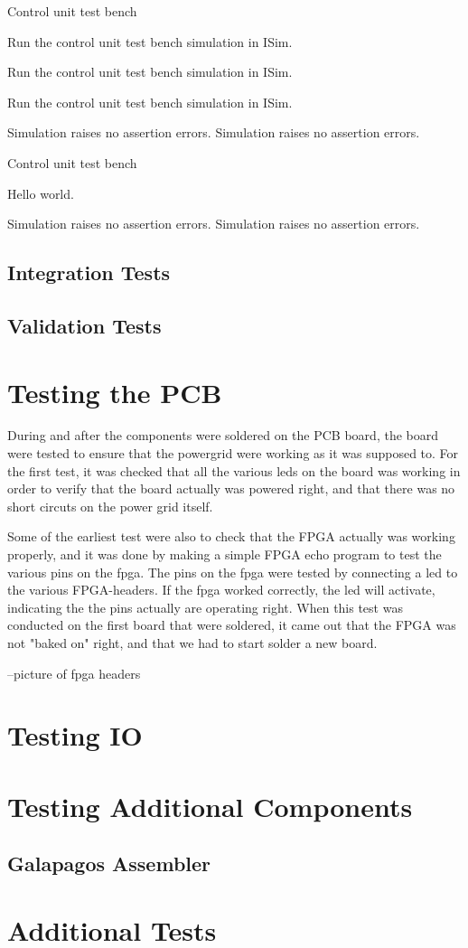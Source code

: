 \test
{Control unit test bench}{
    \item{Run the control unit test bench simulation in ISim.}
    \item{Run the control unit test bench simulation in ISim.}
    \item{Run the control unit test bench simulation in ISim.}
}{Simulation raises no assertion errors.}
{Simulation raises no assertion errors.}

\test
{Control unit test bench}
{
\item{Hello world.}
}
{Simulation raises no assertion errors.}
{Simulation raises no assertion errors.}

\subsection{Integration Tests}


\subsection{Validation Tests}

\section{Testing the PCB}
During and after the components were soldered on the PCB board, the board were tested to ensure that the powergrid were working as it was supposed to.
For the first test, it was checked that all the various leds on the board was working in order to verify that the board actually was powered right, and that there was
no short circuts on the power grid itself.

Some of the earliest test were also to check that the FPGA actually was working properly, and it was done by making a simple FPGA echo program to test the various pins on the fpga.
The pins on the fpga were tested by connecting a led to the various FPGA-headers. If the fpga worked correctly, the led will activate, indicating the the pins actually are operating right.
When this test was conducted on the first board that were soldered, it came out that the FPGA was not "baked on" right, and that we had to start solder a new board. 

--picture of fpga headers

\section{Testing IO}


\section{Testing Additional Components}

\subsection{Galapagos Assembler}


\section{Additional Tests}


